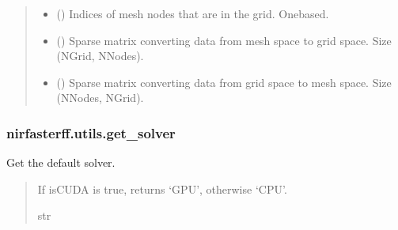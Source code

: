 \documentclass[letterpaper,10pt,english]{sphinxmanual}
\begin{document}
\begin{fulllineitems}
\begin{quote}
\begin{description}
\begin{itemize}
\item {} 
\sphinxAtStartPar
{} () \textendash{} Indices of mesh nodes that are in the grid. One\sphinxhyphen{}based.

\item {} 
\sphinxAtStartPar
{} () \textendash{} Sparse matrix converting data from mesh space to grid space. Size (NGrid, NNodes).

\item {} 
\sphinxAtStartPar
{} () \textendash{} Sparse matrix converting data from grid space to mesh space. Size (NNodes, NGrid).

\end{itemize}


\end{description}\end{quote}

\end{fulllineitems}


\sphinxstepscope


\subsubsection{nirfasterff.utils.get\_solver}
\label{\detokenize{_autosummary/nirfasterff.utils.get_solver:nirfasterff-utils-get-solver}}\label{\detokenize{_autosummary/nirfasterff.utils.get_solver::doc}}

\begin{fulllineitems}
\label{\detokenize{_autosummary/nirfasterff.utils.get_solver:nirfasterff.utils.get_solver}}
\pysigstartsignatures
{}
\pysigstopsignatures
\sphinxAtStartPar
Get the default solver.
\begin{quote}\begin{description}
\sphinxAtStartPar
If isCUDA is true, returns ‘GPU’, otherwise ‘CPU’.

\sphinxAtStartPar
str

\end{description}\end{quote}

\end{fulllineitems}
\end{document}
